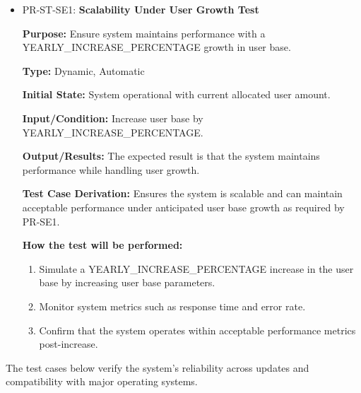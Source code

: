 \documentclass[12pt, titlepage]{article}
\begin{document}
\begin{itemize}
  \item PR-ST-SE1: \textbf{Scalability Under User Growth Test}
  \begin{mdframed}[linewidth=0.5mm]
      \textbf{Purpose:} Ensure system maintains performance with a \\ YEARLY\_INCREASE\_PERCENTAGE growth in user base. \par
      \textbf{Type:} Dynamic, Automatic \par
      \textbf{Initial State:} System operational with current allocated user amount. \par
      \textbf{Input/Condition:} Increase user base by YEARLY\_INCREASE\_PERCENTAGE. \par
      \textbf{Output/Results:} The expected result is that the system maintains performance while handling user growth. \par
      \textbf{Test Case Derivation:} Ensures the system is scalable and can maintain acceptable performance under anticipated user base growth as required by PR-SE1. \par
      \textbf{How the test will be performed:}
      \begin{enumerate}[noitemsep]
        \item Simulate a YEARLY\_INCREASE\_PERCENTAGE increase in the user base by increasing user base parameters.
        \item Monitor system metrics such as response time and error rate.
        \item Confirm that the system operates within acceptable performance metrics post-increase.
      \end{enumerate}
  \end{mdframed}
\end{itemize}

\vspace{1em}
\hspace{2em}The test cases below verify the system’s reliability across updates and compatibility with major operating systems.
\end{document}
